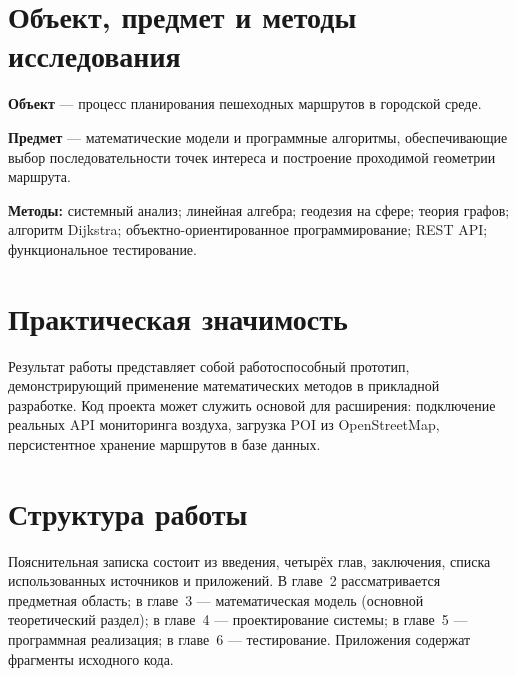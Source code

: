 \section{Объект, предмет и методы исследования}

\textbf{Объект} --- процесс планирования пешеходных маршрутов в городской среде.

\textbf{Предмет} --- математические модели и программные алгоритмы, обеспечивающие
выбор последовательности точек интереса и построение проходимой геометрии маршрута.

\textbf{Методы:} системный анализ; линейная алгебра; геодезия на сфере; теория
графов; алгоритм Dijkstra; объектно-ориентированное программирование; REST API;
функциональное тестирование.

\section{Практическая значимость}

Результат работы представляет собой работоспособный прототип, демонстрирующий
применение математических методов в прикладной разработке. Код проекта может
служить основой для расширения: подключение реальных API мониторинга воздуха,
загрузка POI из OpenStreetMap, персистентное хранение маршрутов в базе данных.

\section{Структура работы}

Пояснительная записка состоит из введения, четырёх глав, заключения, списка
использованных источников и приложений. В главе~2 рассматривается предметная
область; в главе~3 --- математическая модель (основной теоретический раздел);
в главе~4 --- проектирование системы; в главе~5 --- программная реализация;
в главе~6 --- тестирование. Приложения содержат фрагменты исходного кода.
